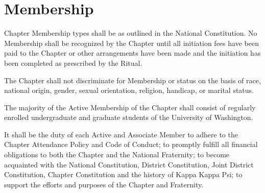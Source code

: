 \documentclass[11pt]{article}
\begin{document}
\section{Membership}
\begin{legal}
  \item
    Chapter Membership types shall be as outlined in the National Constitution.
    No Membership shall be recognized by the Chapter until all initiation fees have been paid to the Chapter or other arrangements have been made and the initiation has been completed as prescribed by the Ritual.
  \item
    The Chapter shall not discriminate for Membership or status on the basis of race, national origin, gender, sexual orientation, religion, handicap, or marital status.
  \item
    The majority of the Active Membership of the Chapter shall consist of regularly enrolled undergraduate and graduate students of the University of Washington.
  \item
    It shall be the duty of each Active and Associate Member to adhere to the Chapter Attendance Policy and Code of Conduct; to promptly fulfill all financial obligations to both the Chapter and the National Fraternity; to become acquainted with the National Constitution, District Constitution, Joint District Constitution, Chapter Constitution and the history of Kappa Kappa Psi; to support the efforts and purposes of the Chapter and Fraternity.
\end{legal}
\end{document}
